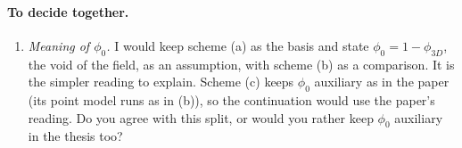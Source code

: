 \documentclass[11pt,a4paper]{article}
\begin{document}
\paragraph{To decide together.}
\begin{enumerate}
\item[] \emph{Meaning of $\phi_0$.} I would keep scheme (a) as the basis and state
  $\phi_0=1-\phi_{3D}$, the void of the field, as an assumption, with scheme (b)
  as a comparison. It is the simpler reading to explain. Scheme (c) keeps
  $\phi_0$ auxiliary as in the paper (its point model runs as in (b)), so the
  continuation would use the paper's reading. Do you agree with this split, or
  would you rather keep $\phi_0$ auxiliary in the thesis too?
\end{enumerate}
\end{document}
